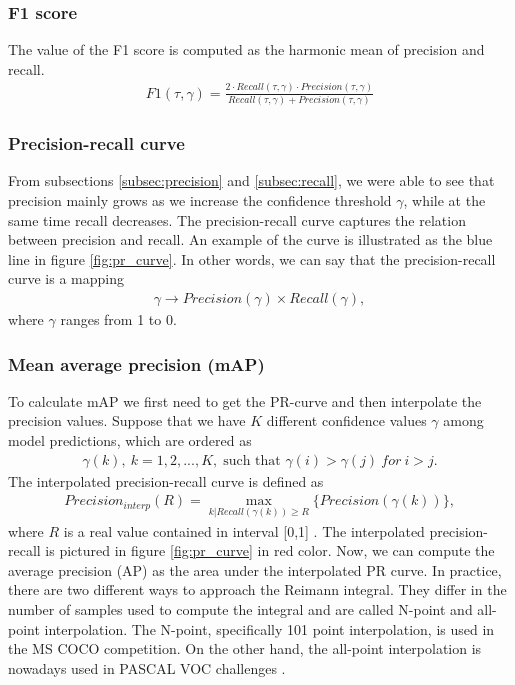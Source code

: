 \subsubsection{F1 score}
The value of the F1 score is computed as the harmonic mean of precision and recall.
\begin{align}
    F1(\tau, \gamma) = \frac{2 \cdot Recall(\tau,\gamma) \cdot Precision(\tau, \gamma)}{Recall(\tau,\gamma) + Precision(\tau, \gamma)}
\end{align}

\subsubsection{Precision-recall curve}
From subsections \ref{subsec:precision} and \ref{subsec:recall}, we were able to see that precision mainly grows as we increase the confidence threshold $\gamma$, while at the same time recall decreases. The precision-recall curve captures the relation between precision and recall. An example of the curve is illustrated as the blue line in figure \ref{fig:pr_curve}. In other words, we can say that the precision-recall curve is a mapping
\begin{align}
    \gamma \rightarrow Precision(\gamma) \times  Recall(\gamma),
    \label{eq:pr_curve}
\end{align}
where $\gamma$ ranges from 1 to 0.

\subsubsection{Mean average precision (mAP)}
To calculate mAP we first need to get the PR-curve and then interpolate the precision values. Suppose that we have $K$ different confidence values $\gamma$ among model predictions, which are ordered as
\begin{align}
    \gamma(k),\: k = 1,2,...,K,  \; \text{such that } \gamma(i) > \gamma(j) \: for \: i > j.
\end{align}
The interpolated precision-recall curve is defined as
\begin{align}
    Precision_{interp}(R) = \max_{k|Recall(\gamma(k)) \geq R} \{  Precision(\gamma(k)) \},
\end{align}
where $R$ is a real value contained in interval [0,1] \cite{Padilla2021}.
The interpolated precision-recall is pictured in figure \ref{fig:pr_curve} in red color. Now, we can compute the average precision (AP) as the area under the interpolated PR curve.
In practice, there are two different ways to approach the Reimann integral. They differ in the number of samples used to compute the integral and are called N-point and all-point interpolation. The N-point, specifically 101 point interpolation, is used in the MS COCO competition. On the other hand, the all-point interpolation is nowadays used in PASCAL VOC challenges \cite{Padilla2020, Padilla2020}.

